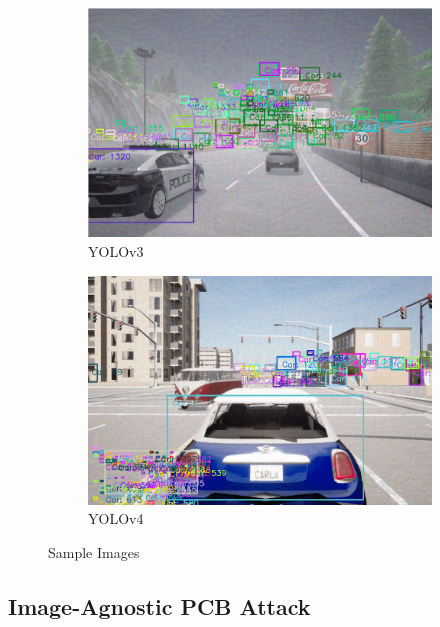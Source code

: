 \begin{figure}[H]
    \centering
    \begin{subfigure}[b]{0.48\textwidth}
        \centering
        \includegraphics[width=\linewidth]{figures/chapter_tracking/yolov3.png}
        \caption{YOLOv3}
        \label{fig:tracking_demoyolov3} 
    \end{subfigure}
    \begin{subfigure}[b]{0.48\textwidth}
        \centering
        \includegraphics[width=\linewidth]{figures/chapter_tracking/yolov4.png}
        \caption{YOLOv4}
        \label{fig:tracking_demo_yolov4}
    \end{subfigure}
  \caption{Sample Images}
  \label{fig:tracking_attack}
\end{figure}

\clearpage

\subsection{Image-Agnostic PCB Attack}

